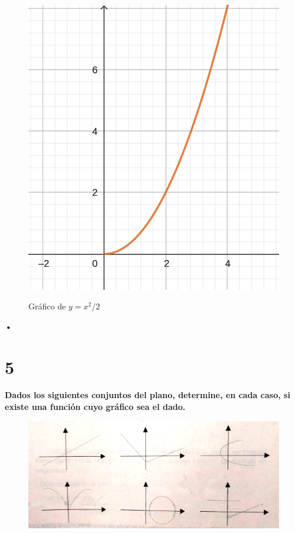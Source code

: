 \documentclass{article}
\begin{document}
\begin{figure}[ht]
\caption{Gráfico de $y = x^2/2 $}
\includegraphics[scale=0.8]{../img/guide_01/ex_04.png} 
\centering
\label{fig:4}
\end{figure}\textbf{•}

\section*{5}
\label{sec:5}

\textbf{Dados los siguientes conjuntos del plano, determine, en cada caso, si existe una función cuyo gráfico sea el dado.}

\begin{figure}[ht]
\includegraphics[scale=2]{../img/guide_01/ex_05.png} 
\centering
\label{fig:5}
\end{figure}
\end{document}

